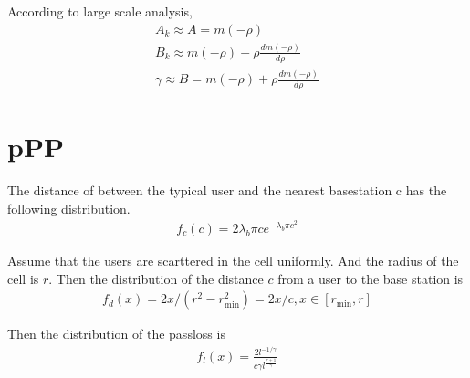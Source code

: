 \documentclass[12pt,journal,draftclsnofoot,onecolumn]{IEEEtran}
\begin{document}
According to large scale analysis,
\begin{eqnarray}
A_k \approx A = m(-\rho)\label{eq:approxA}\\
B_k \approx m(-\rho) +\rho\frac{dm(-\rho)}{d\rho} \label{eq:approxB}\\
\gamma \approx   B = m(-\rho) +\rho\frac{dm(-\rho)}{d\rho} \label{eq:approxGamma}
\end{eqnarray}

\section{pPP}
The distance of between the typical user and the nearest basestation c has the following distribution.
\begin{eqnarray}
f_c (c) = 2\lambda_b\pi c e^{-\lambda_b\pi c^2}
\end{eqnarray}

Assume that the users are scarttered in the cell uniformly. And the radius of the cell is $r$. Then the distribution of the distance $c$ from a user to the base station is 
\begin{eqnarray}
f_d(x) = 2x/(r^2 -r_{\mathrm{min}}^2) = 2x/c, x \in [r_{\mathrm{min}}, r]
\end{eqnarray}

Then the distribution of the passloss is 
\begin{eqnarray}
f_l(x) = \frac{2l^{-1/\gamma}}{c\gamma l^{\frac{r+1}{\gamma}}}
\end{eqnarray}
\end{document}
